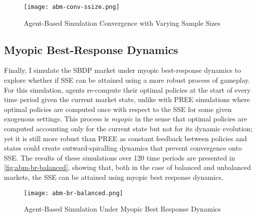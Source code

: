 \begin{figure}[ht] 
    \centering
    \caption{Agent-Based Simulation Convergence with Varying Sample Sizes}
    \texttt{[image: abm-conv-ssize.png]}
    \label{fig:abm-conv-ssize}
\end{figure} 

\subsection{Myopic Best-Response Dynamics}
Finally, I simulate the SBDP market under myopic best-response dynamics to explore whether if SSE can be attained using a more robust process of gameplay. 
For this simulation, agents re-compute their optimal policies at the start of every time period given the current market state, unlike with PREE simulations where optimal policies are computed once with respect to the SSE for some given exogenous settings. 
This process is \textit{myopic} in the sense that optimal policies are computed accounting only for the current state but not for its dynamic evolution; yet it is still more robust than PREE as constant feedback between policies and states could create outward-spiralling dynamics that prevent convergence onto SSE. 
The results of these simulations over 120 time periods are presented in \autoref{fig:abm-br-balanced}, showing that, both in the case of balanced and unbalanced markets, the SSE can be attained using myopic best response dynamics.

\begin{figure}[ht] 
    \centering
    \caption{Agent-Based Simulation Under Myopic Best Response Dynamics}
    \texttt{[image: abm-br-balanced.png]}
    \label{fig:abm-br-balanced}
\end{figure}  


